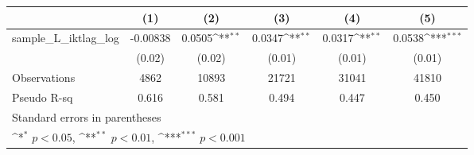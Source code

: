 {
\def\sym#1{\ifmmode^{#1}\else\(^{#1}\)\fi}
\begin{tabular}{l*{5}{c}}
\hline\hline
          &\multicolumn{1}{c}{(1)}         &\multicolumn{1}{c}{(2)}         &\multicolumn{1}{c}{(3)}         &\multicolumn{1}{c}{(4)}         &\multicolumn{1}{c}{(5)}         \\
\hline
sample\_L\_iktlag\_log& -0.00838         &   0.0505\sym{**} &   0.0347\sym{**} &   0.0317\sym{**} &   0.0538\sym{***}\\
          &   (0.02)         &   (0.02)         &   (0.01)         &   (0.01)         &   (0.01)         \\
\hline
Observations&     4862         &    10893         &    21721         &    31041         &    41810         \\
Pseudo R-sq&    0.616         &    0.581         &    0.494         &    0.447         &    0.450         \\
\hline\hline
\multicolumn{6}{l}{\footnotesize Standard errors in parentheses}\\
\multicolumn{6}{l}{\footnotesize \sym{*} \(p<0.05\), \sym{**} \(p<0.01\), \sym{***} \(p<0.001\)}\\
\end{tabular}
}
